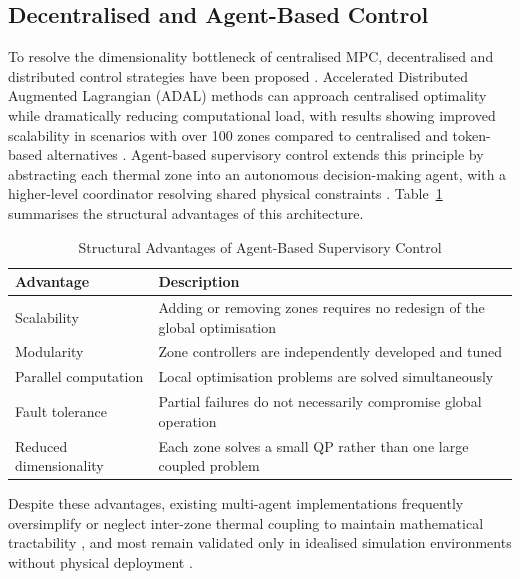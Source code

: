 \documentclass[12pt, a4paper]{article}
\begin{document}
	\subsection{Decentralised and Agent-Based Control}
	
	To resolve the dimensionality bottleneck of centralised MPC, decentralised and distributed control strategies have been proposed \citep{wangSupervisoryOptimalControl2008}. Accelerated Distributed Augmented Lagrangian (ADAL) methods can approach centralised optimality while dramatically reducing computational load, with results showing improved scalability in scenarios with over 100 zones compared to centralised and token-based alternatives \citep{yangHVACEnergyCost2019}. Agent-based supervisory control extends this principle by abstracting each thermal zone into an autonomous decision-making agent, with a higher-level coordinator resolving shared physical constraints \citep{dounisAdvancedControlSystems2009, naiduAdvancedControlStrategies2011}. Table~\ref{tab:decentralised_advantages} summarises the structural advantages of this architecture.
	
	\begin{table}[h]
		\centering
		\caption{Structural Advantages of Agent-Based Supervisory Control}
		\label{tab:decentralised_advantages}
		\begin{tabular}{lp{9cm}}
			\toprule
			\textbf{Advantage} & \textbf{Description} \\
			\midrule
			Scalability & Adding or removing zones requires no redesign of the global optimisation \\
			Modularity & Zone controllers are independently developed and tuned \\
			Parallel computation & Local optimisation problems are solved simultaneously \\
			Fault tolerance & Partial failures do not necessarily compromise global operation \\
			Reduced dimensionality & Each zone solves a small QP rather than one large coupled problem \\
			\bottomrule
		\end{tabular}
	\end{table}
	
	Despite these advantages, existing multi-agent implementations frequently oversimplify or neglect inter-zone thermal coupling to maintain mathematical tractability \citep{yangHVACEnergyCost2019}, and most remain validated only in idealised simulation environments without physical deployment \citep{aframTheoryApplicationsHVAC2014, balaliEnergyModellingControl2023}.
	
\end{document}
